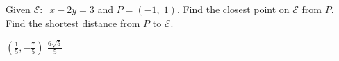
\begin{Exercise}[
name={},
title={}, 
difficulty=0,
origin={\cite{YL}}]
Given $\mathcal{E}:\;\; x-2y=3$ and $P=(-1,\;1)$.
\Question Find the closest point on $\mathcal{E}$ from $P$.
\Question Find the shortest distance from $P$ to $\mathcal{E}$.

\end{Exercise}
\begin{Answer}
\Question $(\frac15 ,-\frac75)$
\Question $\frac{6\sqrt{5}}{5}$
\end{Answer}
